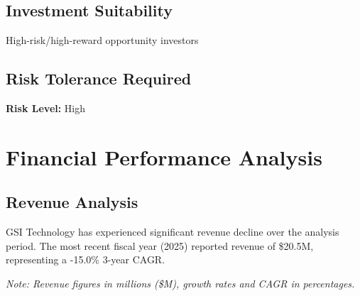 \documentclass[11pt,a4paper]{article}
\begin{document}
\vspace{0.3cm}

\subsection{Investment Suitability}

\noindent High-risk/high-reward opportunity investors

\vspace{0.3cm}

\subsection{Risk Tolerance Required}

\noindent \textbf{Risk Level:} High


\newpage

\section{Financial Performance Analysis}

\subsection{Revenue Analysis}

GSI Technology has experienced significant revenue decline over the analysis period. The most recent fiscal year (2025) reported revenue of \$20.5M, representing a -15.0\% 3-year CAGR.

\small{\textit{Note: Revenue figures in millions (\$M), growth rates and CAGR in percentages.}}


\begin{table}[H]
\centering
\caption{Revenue Growth Metrics (Recent 8 Years)}
\label{tab:revenue_growth}
\end{table}
\end{document}
